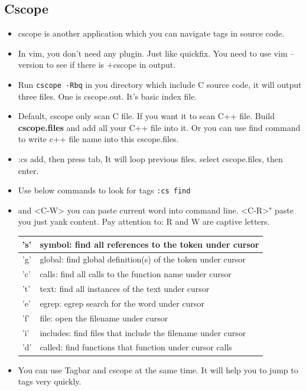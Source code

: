 \documentclass[a4paper,12pt,twoside]{book}
\begin{document}
\subsection{Cscope}
\begin{itemize}

\item cscope is another application which you can navigate tags in source code. 
\item In vim, you don't need any plugin. Just like quickfix. You need to use vim --version to see if there is +cscope in output. 

\item Run \verb=cscope -Rbq= in you directory which include C source code, it will output three files. One is cscope.out. It's basic index file. 

\item Default, cscope only scan C file. If you want it to scan C++ file. Build \textbf{cscope.files} and add all your C++ file into it. Or you can use find command to write c++ file name into this cscope.files.

\item :cs add, then press tab, It will loop previous files. select cscope.files, then enter.

\item Use below commands to look for tags \verb=:cs find= 
\item <C-R> and <C-W> you can paste current word into command line. <C-R>" paste you just yank content. Pay attention to: R and W are captive letters.
  
\begin{tabular}{p{}|p{}}
\hline 
's'  & symbol: find all references to the token under cursor \\
\hline 
'g'  & global: find global definition(s) of the token under cursor \\
\hline 
'c'  & calls:  find all calls to the function name under cursor \\
\hline 
't'  & text:   find all instances of the text under cursor \\
\hline 
'e'  & egrep:  egrep search for the word under cursor \\
\hline 
'f'  & file:   open the filename under cursor \\
\hline 
'i'  & includes: find files that include the filename under cursor \\
\hline 
'd' &  called: find functions that function under cursor calls \\
\hline
\end{tabular}
\item You can use Tagbar and cscope at the same time. It will help you to jump to tags very quickly. 	
\end{itemize}
\end{document}

